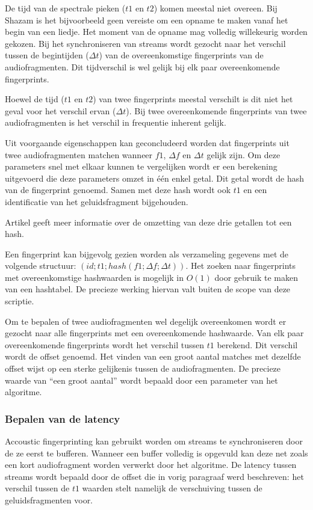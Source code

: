 De tijd van de spectrale pieken ($t1$ en $t2$) komen meestal niet overeen. Bij Shazam is het bijvoorbeeld geen vereiste om een opname te maken vanaf het begin van een liedje. Het moment van de opname mag volledig willekeurig worden gekozen. Bij het synchroniseren van streams wordt gezocht naar het verschil tussen de begintijden ($\Delta t$) van de overeenkomstige fingerprints van de audiofragmenten. Dit tijdverschil is wel gelijk bij elk paar overeenkomende fingerprints.

Hoewel de tijd ($t1$ en $t2$) van twee fingerprints meestal verschilt is dit niet het geval voor het verschil ervan ($\Delta t$). Bij twee overeenkomende fingerprints van twee audiofragmenten is het verschil in frequentie inherent gelijk.

Uit voorgaande eigenschappen kan geconcludeerd worden dat fingerprints uit twee audiofragmenten matchen wanneer $ f1 $, $ \Delta f $ en $ \Delta t $ gelijk zijn. Om deze parameters snel met elkaar kunnen te vergelijken wordt er een berekening uitgevoerd die deze parameters omzet in één enkel getal. Dit getal wordt de hash van de fingerprint genoemd. Samen met deze hash wordt ook $ t1 $ en een identificatie van het geluidsfragment bijgehouden.

Artikel \cite{six2014panako} geeft meer informatie over de omzetting van deze drie getallen tot een hash.

Een fingerprint kan bijgevolg gezien worden als verzameling gegevens met de volgende structuur: $ ( id; t1; hash(f1; \Delta f; \Delta t) ) $. Het zoeken naar fingerprints met overeenkomstige hashwaarden is mogelijk in $O(1)$ door gebruik te maken van een hashtabel. De precieze werking hiervan valt buiten de scope van deze scriptie.

Om te bepalen of twee audiofragmenten wel degelijk overeenkomen wordt er gezocht naar alle fingerprints met een overeenkomende hashwaarde. Van elk paar overeenkomende fingerprints wordt het verschil tussen $ t1 $ berekend. Dit verschil wordt de offset genoemd. Het vinden van een groot aantal matches met dezelfde offset wijst op een sterke gelijkenis tussen de audiofragmenten. De precieze waarde van ``een groot aantal'' wordt bepaald door een parameter van het algoritme.

\subsubsection{Bepalen van de latency}

Accoustic fingerprinting kan gebruikt worden om streams te synchroniseren door de ze eerst te bufferen. Wanneer een buffer volledig is opgevuld kan deze net zoals een kort audiofragment worden verwerkt door het algoritme. De latency tussen streams wordt bepaald door de offset die in vorig paragraaf werd beschreven: het verschil tussen de $ t1 $ waarden stelt namelijk de verschuiving tussen de geluidsfragmenten voor.

